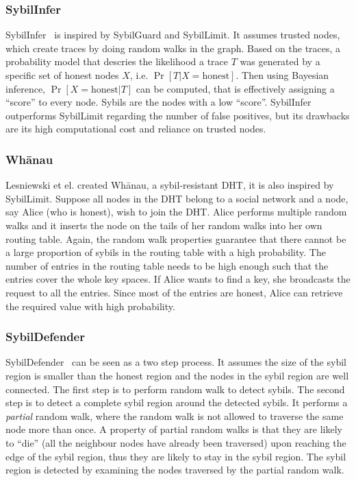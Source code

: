 \subsubsection{SybilInfer}
SybilInfer~\cite{danezis2009sybilinfer} is inspired by SybilGuard and
SybilLimit. It assumes trusted nodes, which create traces by doing random walks
in the graph. Based on the traces, a probability model that descries the
likelihood a trace $T$ was generated by a specific set of honest nodes $X$, i.e.
$\Pr[ T | X = \text{honest}]$. Then using Bayesian inference, $\Pr[ X =
\text{honest}| T ]$ can be computed, that is effectively assigning a ``score''
to every node. Sybils are the nodes with a low ``score''. SybilInfer outperforms
SybilLimit regarding the number of false positives, but its drawbacks are its
high computational cost and reliance on trusted nodes.

\subsubsection{Wh\={a}nau}
Lesniewski et el. created Wh\={a}nau, a sybil-resistant DHT, it is also inspired
by SybilLimit\cite{lesniewski2008sybil, lesniewski2010whanau}. Suppose all nodes
in the DHT belong to a social network and a node, say Alice (who is honest),
wish to join the DHT. Alice performs multiple random walks and it inserts the
node on the tails of her random walks into her own routing table. Again, the
random walk properties guarantee that there cannot be a large proportion of
sybils in the routing table with a high probability. The number of entries in
the routing table needs to be high enough such that the entries cover the whole
key spaces. If Alice wants to find a key, she broadcasts the request to all the
entries. Since most of the entries are honest, Alice can retrieve the required
value with high probability.

\subsubsection{SybilDefender}
SybilDefender~\cite{wei2012sybildefender} can be seen as a two step process. It
assumes the size of the sybil region is smaller than the honest region and the
nodes in the sybil region are well connected. The first step is to perform
random walk to detect sybils. The second step is to detect a complete sybil
region around the detected sybils. It performs a \emph{partial} random walk,
where the random walk is not allowed to traverse the same node more than once. A
property of partial random walks is that they are likely to ``die'' (all the
neighbour nodes have already been traversed) upon reaching the edge of the sybil
region, thus they are likely to stay in the sybil region. The sybil region is
detected by examining the nodes traversed by the partial random walk.

